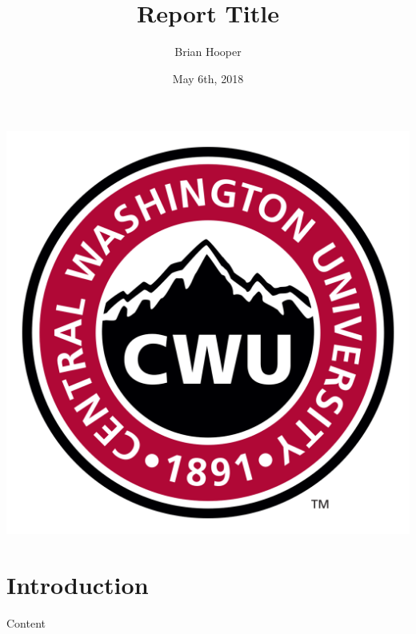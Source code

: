 \documentclass[12pt]{article}
\author{Brian Hooper}
\title{Report Title}
\date{May 6th, 2018}
\begin{document}
	\maketitle
\begin{center}
	\includegraphics[width=0.40\columnwidth]{figures/logos/cwu.png}
\end{center}
	\pagebreak
	\tableofcontents \pagebreak
	
	\section{Introduction}
	
	Content \cite{knuth}
	\clearpage
	
\end{document}
